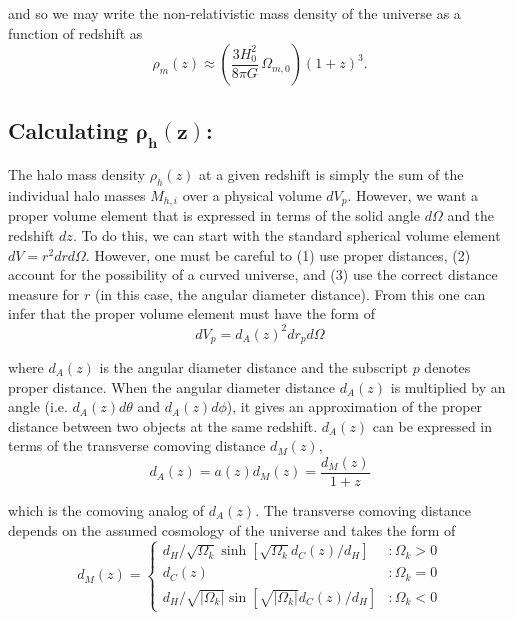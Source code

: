 \documentclass[%
 reprint,
 amsmath,amssymb,
 aps,nofootinbib
]{revtex4-1}
\begin{document}
\noindent and so we may write the non-relativistic mass density of the universe as a function of redshift as
\begin{equation}\label{rho}
\rho_m(z)\approx\left(\frac{3H_0^2}{8\pi G}\,\Omega_{m,0}\right)(1+z)^3.
\end{equation}

\subsection*{Calculating $\mathbf{\rho_h(z)}$:}

The halo mass density $\rho_h(z)$ at a given redshift is simply the sum of the individual halo masses $M_{h,i}$ over a physical volume $dV_p$. However, we want a proper volume element that is expressed in terms of the solid angle $d\Omega$ and the redshift $dz$. To do this, we can start with the standard spherical volume element $dV=r^2drd\Omega$. However, one must be careful to (1) use proper distances, (2) account for the possibility of a curved universe, and (3) use the correct distance measure for $r$ (in this case, the angular diameter distance). From this one can infer that the proper volume element must have the form of
\begin{equation}\label{proper_element}
dV_p=d_A(z)^2dr_pd\Omega
\end{equation}

\noindent where $d_A(z)$ is the angular diameter distance and the subscript $p$ denotes proper distance. When the angular diameter distance $d_A(z)$ is multiplied by an angle (i.e. $d_A(z)d\theta$ and $d_A(z)d\phi$), it gives an approximation of the proper distance between two objects at the same redshift. $d_A(z)$ can be expressed in terms of the transverse comoving distance $d_M(z)$,
\begin{equation}\label{angular2transverse}
d_A(z)=a(z)d_M(z)=\frac{d_M(z)}{1+z}
\end{equation}

\noindent which is the comoving analog of $d_A(z)$. The transverse comoving distance depends on the assumed cosmology of the universe and takes the form of
\begin{equation}\label{comoving_transverse}
d_M(z)=\left\{
     \begin{array}{lr}
       d_H/\sqrt{\Omega_k}\sinh\left[\sqrt{\Omega_k}d_C(z)/d_H\right] & : \Omega_k>0\\
       d_C(z) & : \Omega_k=0\\
       d_H/\sqrt{|\Omega_k|}\sin\left[\sqrt{|\Omega_k|}d_C(z)/d_H\right] & : \Omega_k<0
     \end{array}
   \right.
\end{equation}
\end{document}
